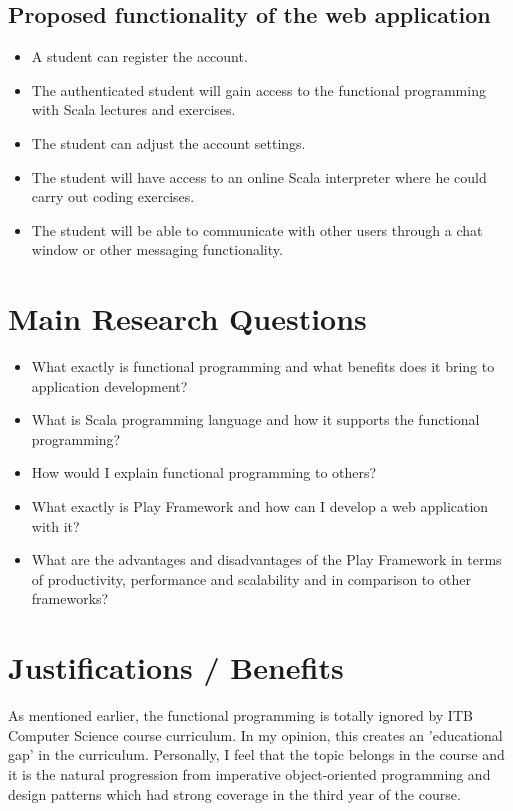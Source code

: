 \documentclass[12pt,twoside,a4paper]{report}
\begin{document}
\subsection{Proposed functionality of the web application}\label{1.2.1}
\begin{itemize}\itemsep1pt \parskip0pt 
\item A student can register the account.
\item The authenticated student will gain access to the functional programming with Scala lectures and exercises.
\item The student can adjust the account settings.
\item The student will have access to an online Scala interpreter where he could carry out coding exercises.
\item The student will be able to communicate with other users through a chat window or other messaging functionality.
\end{itemize}

\section{Main Research Questions}\label{1.3}
\begin{itemize}\itemsep1pt \parskip0pt 
\item What exactly is functional programming and what benefits does it bring to application development?
\item What is Scala programming language and how it supports the functional programming?
\item How would I explain functional programming to others?
\item What exactly is Play Framework and how can I develop a web application with it?
\item What are the advantages and disadvantages of the Play Framework in terms of productivity, performance and scalability and in comparison to other frameworks?
\end{itemize}

\section{Justifications / Benefits}\label{1.4}
As mentioned earlier, the functional programming is totally ignored by ITB Computer Science course curriculum. In my opinion, this creates an 'educational gap' in the curriculum. Personally, I feel that the topic belongs in the course and it is the natural progression from imperative object-oriented programming and design patterns which had strong coverage in the third year of the course.
\end{document}
